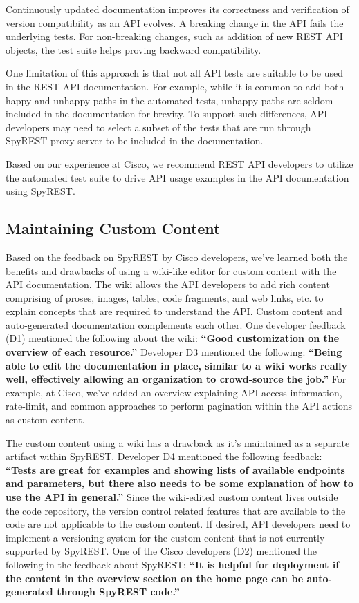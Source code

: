 \documentclass[10pt, conference]{IEEEtran}
\begin{document}
Continuously updated documentation improves its correctness and verification of version compatibility as an API evolves. A breaking change in the API fails the underlying tests. For non-breaking changes, such as addition of new REST API objects, the test suite helps proving backward compatibility.

One limitation of this approach is that not all API tests are suitable to be used in the REST API documentation. For example, while it is common to add both happy and unhappy paths in the automated tests, unhappy paths are seldom included in the documentation for brevity. To support such differences, API developers may need to select a subset of the tests that are run through SpyREST proxy server to be included in the documentation.

Based on our experience at Cisco, we recommend REST API developers to utilize the automated test suite to drive API usage examples in the API documentation using SpyREST.

\subsection{Maintaining Custom Content}
Based on the feedback on SpyREST by Cisco developers, we've learned both the benefits and drawbacks of using a wiki-like editor for custom content with the API documentation. The wiki allows the API developers to add rich content comprising of proses, images, tables, code fragments, and web links, etc. to explain concepts that are required to understand the API. Custom content and auto-generated documentation complements each other. One developer feedback (D1) mentioned the following about the wiki: \textbf{``Good customization on the overview of each resource.''} Developer D3 mentioned the following: \textbf{``Being able to edit the documentation in place, similar to a wiki works really well, effectively allowing an organization to crowd-source the job.''} For example, at Cisco, we've added an overview explaining API access information, rate-limit, and common approaches to perform pagination within the API actions as custom content.

The custom content using a wiki has a drawback as it's maintained as a separate artifact within SpyREST. Developer D4 mentioned the following feedback: \textbf{``Tests are great for examples and showing lists of available endpoints and parameters, but there also needs to be some explanation of how to use the API in general.''} Since the wiki-edited custom content lives outside the code repository, the version control related features that are available to the code are not applicable to the custom content. If desired, API developers need to implement a versioning system for the custom content that is not currently supported by SpyREST. One of the Cisco developers (D2) mentioned the following in the feedback about SpyREST: \textbf{``It is helpful for deployment if the content in the overview section on the home page can be auto-generated through SpyREST code.''}
\end{document}

